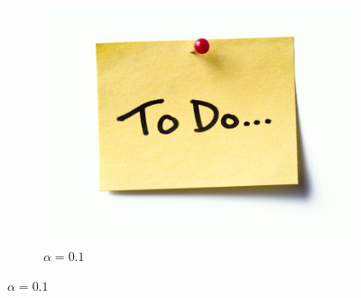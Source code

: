 \begin{figure}
                \begin{subfigure}[b]{0.32\textwidth}
                    \centering
                    \includegraphics[width=\textwidth]{figures/todo.jpg}
                    \caption{$\alpha=0.1$}
                \end{subfigure}
                

\end{figure}
